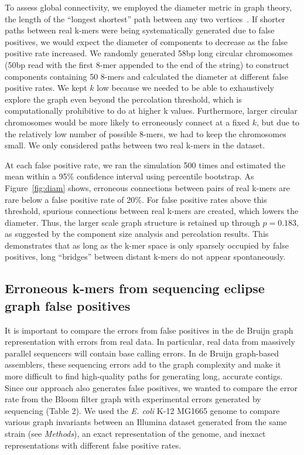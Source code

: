 \documentclass[draft]{pnastwo}
\begin{document}
\begin{article}
To assess global connectivity, we employed the diameter metric in
graph theory, the length of the ``longest shortest'' path between any
two vertices~\cite{bondy2008graph}.  If shorter paths between real
k-mers were being
systematically generated due to false positives, we would expect the
diameter of components to decrease as the false positive rate
increased.  We randomly generated 58bp long circular chromosomes (50bp
read with the first 8-mer appended to the end of the string) to
construct components containing 50 8-mers and calculated the diameter
at different false positive rates. We kept $k$ low because we needed
to be able to exhaustively explore the graph even beyond the
percolation threshold, which is computationally prohibitive to do at
higher k values. Furthermore, larger circular chromosomes would be
more likely to erroneously connect at a fixed $k$, but due to the
relatively low number of possible 8-mers, we had to keep the
chromosomes small.  We only considered paths between two real k-mers
in the dataset.

At each false positive rate, we ran the simulation 500 times and
estimated the mean within a 95\% confidence interval using percentile
bootstrap. As Figure~\ref{fig:diam} shows, erroneous connections
between pairs of real k-mers are rare below a false positive rate of
20\%.  For false positive rates above this threshold, spurious
connections between real k-mers are created, which lowers the
diameter.  Thus, the larger scale graph structure is retained up
through $p = 0.183$, as suggested by the component size analysis and
percolation results.  This demonstrates that as long as the k-mer
space is only sparsely occupied by false positives, long ``bridges''
between distant k-mers do not appear spontaneously.

\subsection{Erroneous k-mers from sequencing eclipse graph false positives}


It is important to compare the errors from false positives in the de
Bruijn graph representation with errors from real data.  In
particular, real data from massively parallel sequencers will contain
base calling errors.  In de Bruijn graph-based assemblers, these
sequencing errors add to the graph complexity and make it more
difficult to find high-quality paths for generating long, accurate
contigs. Since our approach also generates false positives, we wanted
to compare the error rate from the Bloom filter graph with
experimental errors generated by sequencing (Table
2). We used the \emph{E. coli} K-12 MG1665 genome to
compare various graph invariants between an Illumina dataset generated
from the same strain (see \emph{Methods}), an exact representation of
the genome, and inexact representations with different false positive
rates.


\end{article}
\end{document}
